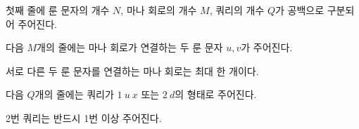 첫째 줄에 룬 문자의 개수 $N$, 마나 회로의 개수 $M$, 쿼리의 개수 $Q$가 공백으로 구분되어 주어진다. 

다음 $M$개의 줄에는 마나 회로가 연결하는 두 룬 문자 $u, v$가 주어진다.

서로 다른 두 룬 문자를 연결하는 마나 회로는 최대 한 개이다.

다음 $Q$개의 줄에는 쿼리가 $1~u~x$ 또는 $2~d$의 형태로 주어진다.

2번 쿼리는 반드시 1번 이상 주어진다.